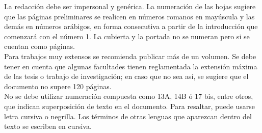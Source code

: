 La redacción debe ser impersonal y genérica. La numeración de las hojas sugiere que las páginas preliminares se realicen en números romanos en mayúscula y las demás en números arábigos, en forma consecutiva a partir de la introducción que comenzará con el número 1. La cubierta y la portada no se numeran pero si se cuentan como páginas.\\

Para trabajos muy extensos se recomienda publicar más de un volumen. Se debe tener en cuenta que algunas facultades tienen reglamentada la extensión máxima de las tesis  o trabajo de investigación; en caso que no sea así, se sugiere que el documento no supere 120 páginas.\\

No se debe utilizar numeración compuesta como 13A, 14B ó 17 bis, entre otros, que indican superposición de texto en el documento. Para resaltar, puede usarse letra cursiva o negrilla. Los términos de otras lenguas que aparezcan dentro del texto se escriben en cursiva.\\